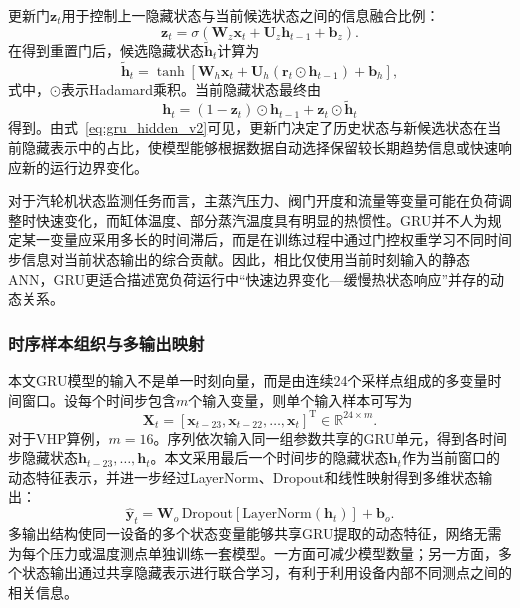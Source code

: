 更新门$\mathbf{z}_t$用于控制上一隐藏状态与当前候选状态之间的信息融合比例：
\begin{equation}
    \mathbf{z}_t=
    \sigma\left(
    \mathbf{W}_z\mathbf{x}_t+
    \mathbf{U}_z\mathbf{h}_{t-1}+
    \mathbf{b}_z
    \right).
    \label{eq:gru_update_v2}
\end{equation}
在得到重置门后，候选隐藏状态$\tilde{\mathbf{h}}_t$计算为
\begin{equation}
    \tilde{\mathbf{h}}_t=
    \tanh\left[
    \mathbf{W}_h\mathbf{x}_t+
    \mathbf{U}_h\left(
    \mathbf{r}_t\odot\mathbf{h}_{t-1}
    \right)+\mathbf{b}_h
    \right],
    \label{eq:gru_candidate_v2}
\end{equation}
式中，$\odot$表示Hadamard乘积。当前隐藏状态最终由
\begin{equation}
    \mathbf{h}_t=
    (1-\mathbf{z}_t)\odot\mathbf{h}_{t-1}
    +\mathbf{z}_t\odot\tilde{\mathbf{h}}_t
    \label{eq:gru_hidden_v2}
\end{equation}
得到。由式~\eqref{eq:gru_hidden_v2}可见，更新门决定了历史状态与新候选状态在当前隐藏表示中的占比，使模型能够根据数据自动选择保留较长期趋势信息或快速响应新的运行边界变化。

对于汽轮机状态监测任务而言，主蒸汽压力、阀门开度和流量等变量可能在负荷调整时快速变化，而缸体温度、部分蒸汽温度具有明显的热惯性。GRU并不人为规定某一变量应采用多长的时间滞后，而是在训练过程中通过门控权重学习不同时间步信息对当前状态输出的综合贡献。因此，相比仅使用当前时刻输入的静态ANN，GRU更适合描述宽负荷运行中“快速边界变化—缓慢热状态响应”并存的动态关系。

\subsubsection{时序样本组织与多输出映射}

本文GRU模型的输入不是单一时刻向量，而是由连续24个采样点组成的多变量时间窗口。设每个时间步包含$m$个输入变量，则单个输入样本可写为
\begin{equation}
    \mathbf{X}_t=
    \left[
    \mathbf{x}_{t-23},
    \mathbf{x}_{t-22},\ldots,
    \mathbf{x}_t
    \right]^\mathrm{T}
    \in\mathbb{R}^{24\times m}.
\end{equation}
对于VHP算例，$m=16$。序列依次输入同一组参数共享的GRU单元，得到各时间步隐藏状态$\mathbf{h}_{t-23},\ldots,\mathbf{h}_{t}$。本文采用最后一个时间步的隐藏状态$\mathbf{h}_t$作为当前窗口的动态特征表示，并进一步经过LayerNorm、Dropout和线性映射得到多维状态输出：
\begin{equation}
    \hat{\mathbf{y}}_t=
    \mathbf{W}_o\,
    \mathrm{Dropout}
    \left[
    \mathrm{LayerNorm}(\mathbf{h}_t)
    \right]+\mathbf{b}_o.
    \label{eq:gru_output_v2}
\end{equation}
多输出结构使同一设备的多个状态变量能够共享GRU提取的动态特征，网络无需为每个压力或温度测点单独训练一套模型。一方面可减少模型数量；另一方面，多个状态输出通过共享隐藏表示进行联合学习，有利于利用设备内部不同测点之间的相关信息。

